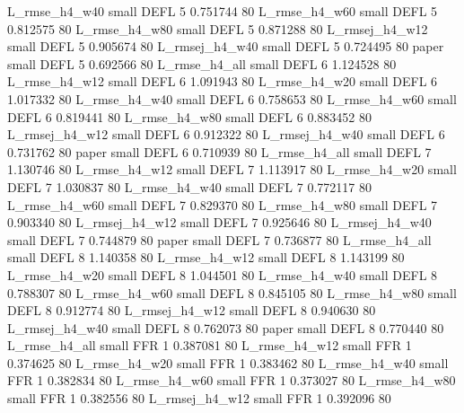  L_rmse_h4_w40      small     DEFL                 5 0.751744 80
 L_rmse_h4_w60      small     DEFL                 5 0.812575 80
 L_rmse_h4_w80      small     DEFL                 5 0.871288 80
L_rmsej_h4_w12      small     DEFL                 5 0.905674 80
L_rmsej_h4_w40      small     DEFL                 5 0.724495 80
         paper      small     DEFL                 5 0.692566 80
 L_rmse_h4_all      small     DEFL                 6 1.124528 80
 L_rmse_h4_w12      small     DEFL                 6 1.091943 80
 L_rmse_h4_w20      small     DEFL                 6 1.017332 80
 L_rmse_h4_w40      small     DEFL                 6 0.758653 80
 L_rmse_h4_w60      small     DEFL                 6 0.819441 80
 L_rmse_h4_w80      small     DEFL                 6 0.883452 80
L_rmsej_h4_w12      small     DEFL                 6 0.912322 80
L_rmsej_h4_w40      small     DEFL                 6 0.731762 80
         paper      small     DEFL                 6 0.710939 80
 L_rmse_h4_all      small     DEFL                 7 1.130746 80
 L_rmse_h4_w12      small     DEFL                 7 1.113917 80
 L_rmse_h4_w20      small     DEFL                 7 1.030837 80
 L_rmse_h4_w40      small     DEFL                 7 0.772117 80
 L_rmse_h4_w60      small     DEFL                 7 0.829370 80
 L_rmse_h4_w80      small     DEFL                 7 0.903340 80
L_rmsej_h4_w12      small     DEFL                 7 0.925646 80
L_rmsej_h4_w40      small     DEFL                 7 0.744879 80
         paper      small     DEFL                 7 0.736877 80
 L_rmse_h4_all      small     DEFL                 8 1.140358 80
 L_rmse_h4_w12      small     DEFL                 8 1.143199 80
 L_rmse_h4_w20      small     DEFL                 8 1.044501 80
 L_rmse_h4_w40      small     DEFL                 8 0.788307 80
 L_rmse_h4_w60      small     DEFL                 8 0.845105 80
 L_rmse_h4_w80      small     DEFL                 8 0.912774 80
L_rmsej_h4_w12      small     DEFL                 8 0.940630 80
L_rmsej_h4_w40      small     DEFL                 8 0.762073 80
         paper      small     DEFL                 8 0.770440 80
 L_rmse_h4_all      small      FFR                 1 0.387081 80
 L_rmse_h4_w12      small      FFR                 1 0.374625 80
 L_rmse_h4_w20      small      FFR                 1 0.383462 80
 L_rmse_h4_w40      small      FFR                 1 0.382834 80
 L_rmse_h4_w60      small      FFR                 1 0.373027 80
 L_rmse_h4_w80      small      FFR                 1 0.382556 80
L_rmsej_h4_w12      small      FFR                 1 0.392096 80
